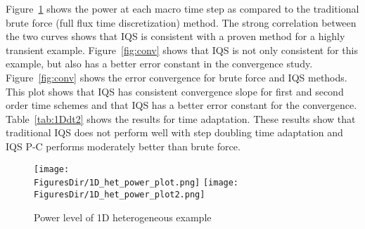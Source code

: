 \documentclass[12pt]{scrartcl}
\newcommand{\fig}[1]{Figure~\ref{#1}}                      %
\newcommand{\tbl}[1]{Table~\ref{#1}}                     %
\newcommand{\FiguresDir}{./figs}
\begin{document}
\fig{fig:power} shows the power at each macro time step as compared to the traditional brute force (full flux time discretization) method.  The strong correlation between the two curves shows that IQS is consistent with a proven method for a highly transient example.  \fig{fig:conv} shows that IQS is not only consistent for this example, but also has a better error constant in the convergence study.  \fig{fig:conv} shows the error convergence for brute force and IQS methods.  This plot shows that IQS has consistent convergence slope for first and second order time schemes and that IQS has a better error constant for the convergence.  \tbl{tab:1Ddt2} shows the results for time adaptation.  These results show that traditional IQS does not perform well with step doubling time adaptation and IQS P-C performs moderately better than brute force.


\begin{figure}[!htbp]
\centering
\texttt{[image: \\FiguresDir/1D\_het\_power\_plot.png]}
\texttt{[image: \\FiguresDir/1D\_het\_power\_plot2.png]}
\caption{Power level of 1D heterogeneous example}
\label{fig:power}
\end{figure}

%
%
\end{document}
